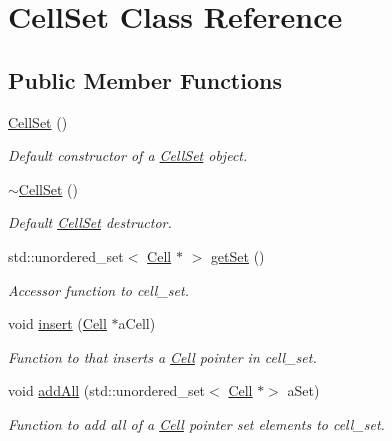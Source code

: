 \hypertarget{class_cell_set}{}\section{Cell\+Set Class Reference}
\label{class_cell_set}
\subsection*{Public Member Functions}
\begin{DoxyCompactItemize}
\item 
\hypertarget{class_cell_set_a0f0e0b518cd5fd70c0e1841e3df6eff9}{}\label{class_cell_set_a0f0e0b518cd5fd70c0e1841e3df6eff9} 
\hyperlink{class_cell_set_a0f0e0b518cd5fd70c0e1841e3df6eff9}{Cell\+Set} ()
\begin{DoxyCompactList}\small\item\em Default constructor of a \hyperlink{class_cell_set}{Cell\+Set} object. \end{DoxyCompactList}\item 
\hypertarget{class_cell_set_a6e9f853835e8982dd178dad534a9678c}{}\label{class_cell_set_a6e9f853835e8982dd178dad534a9678c} 
\hyperlink{class_cell_set_a6e9f853835e8982dd178dad534a9678c}{$\sim$\+Cell\+Set} ()
\begin{DoxyCompactList}\small\item\em Default \hyperlink{class_cell_set}{Cell\+Set} destructor. \end{DoxyCompactList}\item 
std\+::unordered\+\_\+set$<$ \hyperlink{class_cell}{Cell} $\ast$ $>$ \hyperlink{class_cell_set_a16ffb9da795fb77b5214ff0ad276c325}{get\+Set} ()
\begin{DoxyCompactList}\small\item\em Accessor function to cell\+\_\+set. \end{DoxyCompactList}\item 
void \hyperlink{class_cell_set_a589f95793822a6c76b45ab3c5cadeda3}{insert} (\hyperlink{class_cell}{Cell} $\ast$a\+Cell)
\begin{DoxyCompactList}\small\item\em Function to that inserts a \hyperlink{class_cell}{Cell} pointer in cell\+\_\+set. \end{DoxyCompactList}\item 
void \hyperlink{class_cell_set_a9e802e2d27938d62d578bdf602e540c3}{add\+All} (std\+::unordered\+\_\+set$<$ \hyperlink{class_cell}{Cell} $\ast$$>$ a\+Set)
\begin{DoxyCompactList}\small\item\em Function to add all of a \hyperlink{class_cell}{Cell} pointer set elements to cell\+\_\+set. \end{DoxyCompactList}\item 
$$
\end{DoxyCompactItemize}
